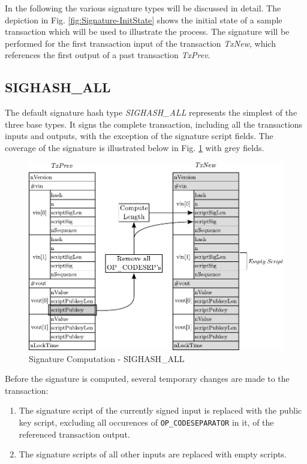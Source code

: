 \noindent
In the following the various signature types will be discussed in detail. The depiction in Fig. \ref{fig:Signature-InitState} shows the initial state of a sample transaction which will be used to illustrate the process. The signature will be performed for the first transaction input of the transaction \emph{TxNew}, which references the first output of a past transaction \emph{TxPrev}.

\clearpage
\subsection*{SIGHASH\_ALL}
The default signature hash type \emph{SIGHASH\_ALL} represents the simplest of the three base types. It signs the complete transaction, including all the transactions inputs and outputs, with the exception of the signature script fields. The coverage of the signature is illustrated below in Fig. \ref{fig:SigHash-All} with grey fields.

\begin{figure}[ht!]
 \centering
 \includegraphics[scale=0.975]{Images/SIGHASH_ALL.pdf}
 \caption{Signature Computation - SIGHASH\_ALL} \label{fig:SigHash-All}
\end{figure}

\noindent
Before the signature is computed, several temporary changes are made to the transaction:
\begin{enumerate}[label=\alph*), leftmargin=1cm]
\item The signature script of the currently signed input is replaced with the public key script, excluding all occurences of \texttt{OP\_CODESEPARATOR} in it, of the referenced transaction output.
\item The signature scripts of all other inputs are replaced with empty scripts.
\end{enumerate}


